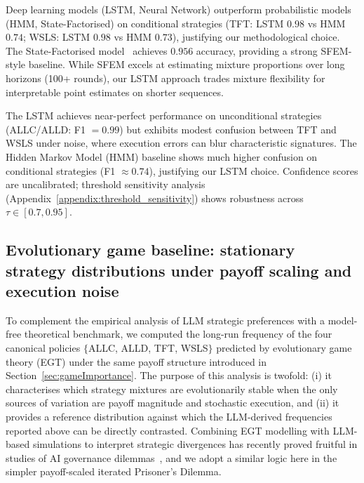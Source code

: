 \documentclass[a4paper,fleqn]{cas-sc}
\begin{document}
Deep learning models (LSTM, Neural Network) outperform probabilistic models (HMM, State-Factorised) on conditional strategies (TFT: LSTM $0.98$ vs HMM $0.74$; WSLS: LSTM $0.98$ vs HMM $0.73$), justifying our methodological choice. The State-Factorised model~\cite{fontana2025nicer} achieves $0.956$ accuracy, providing a strong SFEM-style baseline. While SFEM excels at estimating mixture proportions over long horizons (100+ rounds), our LSTM approach trades mixture flexibility for interpretable point estimates on shorter sequences.

The LSTM achieves near-perfect performance on unconditional strategies (ALLC/ALLD: F1 $=0.99$) but exhibits modest confusion between TFT and WSLS under noise, where execution errors can blur characteristic signatures. The Hidden Markov Model (HMM) baseline shows much higher confusion on conditional strategies (F1 $\approx 0.74$), justifying our LSTM choice. Confidence scores are uncalibrated; threshold sensitivity analysis (Appendix~\ref{appendix:threshold_sensitivity}) shows robustness across $\tau \in [0.7, 0.95]$.

\FloatBarrier

\subsection{Evolutionary game baseline: stationary strategy distributions under payoff scaling and execution noise}\label{sec:egt_baseline}

To complement the empirical analysis of LLM strategic preferences with a model-free theoretical benchmark, we computed the long-run frequency of the four canonical policies $\{$ALLC, ALLD, TFT, WSLS$\}$ predicted by evolutionary game theory (EGT) under the same payoff structure introduced in Section~\ref{sec:gameImportance}. The purpose of this analysis is twofold: (i) it characterises which strategy mixtures are evolutionarily stable when the only sources of variation are payoff magnitude and stochastic execution, and (ii) it provides a reference distribution against which the LLM-derived frequencies reported above can be directly contrasted. Combining EGT modelling with LLM-based simulations to interpret strategic divergences has recently proved fruitful in studies of AI governance dilemmas~\cite{balabanova2025media,buscemi2025llms}, and we adopt a similar logic here in the simpler payoff-scaled iterated Prisoner's Dilemma.
\end{document}
